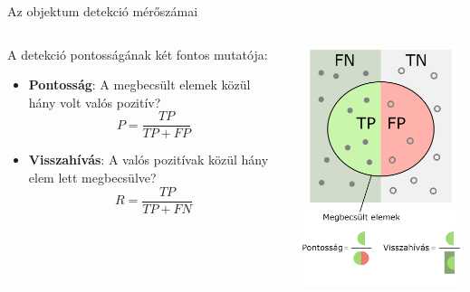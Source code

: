 \documentclass[english, aspectratio=169]{beamer}
\begin{document}
\begin{frame}{Az objektum detekció mérőszámai}
\begin{columns}
\begin{column}{.5\textwidth}
A detekció pontosságának két fontos mutatója:
\begin{itemize}
	\item \textbf{Pontosság}: A megbecsült elemek közül hány volt valós pozitív? 
	\[
	P=\frac{TP}{TP+FP}
	\]
	\item \textbf{Visszahívás}: A valós pozitívak közül hány elem lett megbecsülve? 
	\[
	R=\frac{TP}{TP+FN}
	\]
\end{itemize}
\end{column}
\begin{column}{.5\textwidth}
\begin{center}
\includegraphics[width=7cm, height=7cm, keepaspectratio]{images/od_11.png}
\end{center}
\end{column}
\end{columns}
\end{frame}
\end{document}
